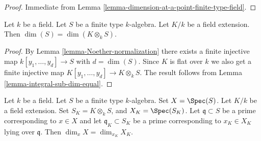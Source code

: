 \begin{proof}
Immediate from Lemma \ref{lemma-dimension-at-a-point-finite-type-field}.
\end{proof}

\begin{lemma}
\label{lemma-dimension-preserved-field-extension}
Let $k$ be a field.
Let $S$ be a finite type $k$-algebra.
Let $K/k$ be a field extension.
Then $\dim(S) = \dim(K \otimes_k S)$.
\end{lemma}

\begin{proof}
By Lemma \ref{lemma-Noether-normalization}
there exists a finite injective map
$k[y_1, \ldots, y_d] \to S$ with $d = \dim(S)$.
Since $K$ is flat over $k$ we also get a finite injective
map $K[y_1, \ldots, y_d] \to K \otimes_k S$.
The result follows from Lemma \ref{lemma-integral-sub-dim-equal}.
\end{proof}

\begin{lemma}
\label{lemma-dimension-at-a-point-preserved-field-extension}
Let $k$ be a field.
Let $S$ be a finite type $k$-algebra.
Set $X = \Spec(S)$.
Let $K/k$ be a field extension.
Set $S_K = K \otimes_k S$, and $X_K = \Spec(S_K)$.
Let $\mathfrak q \subset S$ be a prime corresponding to $x \in X$
and let $\mathfrak q_K \subset S_K$ be a prime corresponding
to $x_K \in X_K$ lying over $\mathfrak q$.
Then $\dim_x X = \dim_{x_K} X_K$.
\end{lemma}

